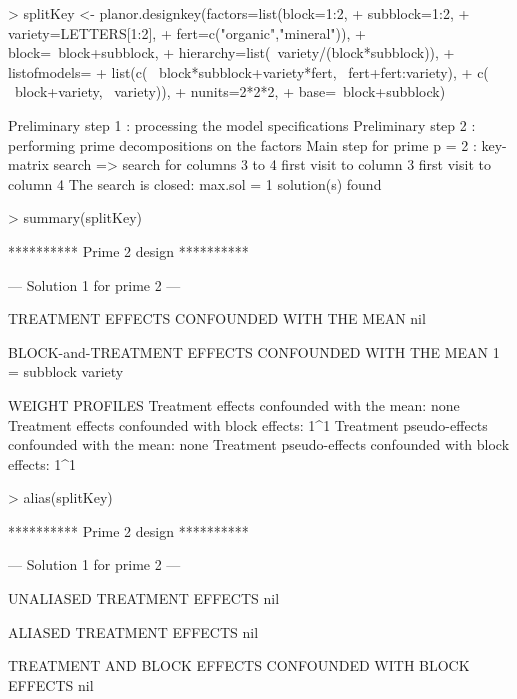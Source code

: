 \documentclass[a4paper]{article}
\begin{document}
\begin{Schunk}
\begin{Sinput}
> splitKey <- planor.designkey(factors=list(block=1:2,
+                                subblock=1:2,
+                                variety=LETTERS[1:2],
+                                fert=c("organic","mineral")), 
+                              block=~block+subblock,
+                              hierarchy=list(~variety/(block*subblock)), 
+                              listofmodels=
+                              list(c( ~block*subblock+variety*fert, ~fert+fert:variety),
+                                   c( ~block+variety,               ~variety)), 
+                              nunits=2*2*2, 
+                              base=~block+subblock)
\end{Sinput}
\begin{Soutput}
Preliminary step 1 : processing the model specifications
Preliminary step 2 : performing prime decompositions on the factors
Main step for prime p = 2 : key-matrix search
  => search for columns 3 to 4 
      first visit to column 3 
      first visit to column 4 
The search is closed: max.sol =  1 solution(s) found 
\end{Soutput}
\begin{Sinput}
> summary(splitKey)
\end{Sinput}
\begin{Soutput}
********** Prime  2  design **********

--- Solution  1  for prime  2  ---

TREATMENT EFFECTS CONFOUNDED WITH THE MEAN
nil

BLOCK-and-TREATMENT EFFECTS CONFOUNDED WITH THE MEAN
1 = subblock variety

WEIGHT PROFILES
Treatment effects confounded with the mean: none 
Treatment effects confounded with block effects: 1^1 
Treatment pseudo-effects confounded with the mean: none
Treatment pseudo-effects confounded with block effects: 1^1 
\end{Soutput}
\begin{Sinput}
> alias(splitKey)
\end{Sinput}
\begin{Soutput}
********** Prime  2  design **********

--- Solution  1  for prime  2  ---

UNALIASED TREATMENT EFFECTS
nil

ALIASED TREATMENT EFFECTS
nil

TREATMENT AND BLOCK EFFECTS CONFOUNDED WITH BLOCK EFFECTS
nil


\end{Soutput}
\end{Schunk}
\end{document}
